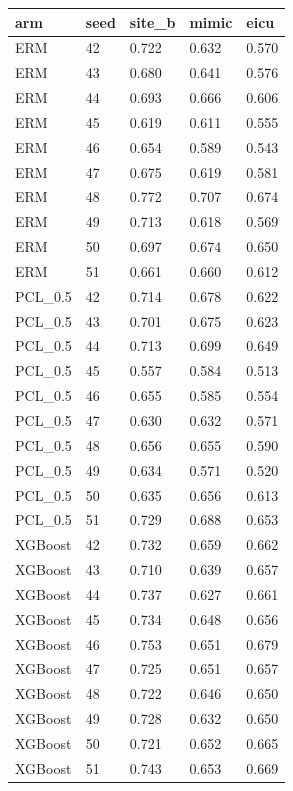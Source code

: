\begin{tabular}{lllll}
\hline
arm & seed & site\_b & mimic & eicu \\
\hline
ERM & 42 & 0.722 & 0.632 & 0.570 \\
ERM & 43 & 0.680 & 0.641 & 0.576 \\
ERM & 44 & 0.693 & 0.666 & 0.606 \\
ERM & 45 & 0.619 & 0.611 & 0.555 \\
ERM & 46 & 0.654 & 0.589 & 0.543 \\
ERM & 47 & 0.675 & 0.619 & 0.581 \\
ERM & 48 & 0.772 & 0.707 & 0.674 \\
ERM & 49 & 0.713 & 0.618 & 0.569 \\
ERM & 50 & 0.697 & 0.674 & 0.650 \\
ERM & 51 & 0.661 & 0.660 & 0.612 \\
PCL\_0.5 & 42 & 0.714 & 0.678 & 0.622 \\
PCL\_0.5 & 43 & 0.701 & 0.675 & 0.623 \\
PCL\_0.5 & 44 & 0.713 & 0.699 & 0.649 \\
PCL\_0.5 & 45 & 0.557 & 0.584 & 0.513 \\
PCL\_0.5 & 46 & 0.655 & 0.585 & 0.554 \\
PCL\_0.5 & 47 & 0.630 & 0.632 & 0.571 \\
PCL\_0.5 & 48 & 0.656 & 0.655 & 0.590 \\
PCL\_0.5 & 49 & 0.634 & 0.571 & 0.520 \\
PCL\_0.5 & 50 & 0.635 & 0.656 & 0.613 \\
PCL\_0.5 & 51 & 0.729 & 0.688 & 0.653 \\
XGBoost & 42 & 0.732 & 0.659 & 0.662 \\
XGBoost & 43 & 0.710 & 0.639 & 0.657 \\
XGBoost & 44 & 0.737 & 0.627 & 0.661 \\
XGBoost & 45 & 0.734 & 0.648 & 0.656 \\
XGBoost & 46 & 0.753 & 0.651 & 0.679 \\
XGBoost & 47 & 0.725 & 0.651 & 0.657 \\
XGBoost & 48 & 0.722 & 0.646 & 0.650 \\
XGBoost & 49 & 0.728 & 0.632 & 0.650 \\
XGBoost & 50 & 0.721 & 0.652 & 0.665 \\
XGBoost & 51 & 0.743 & 0.653 & 0.669 \\
\hline
\end{tabular}
